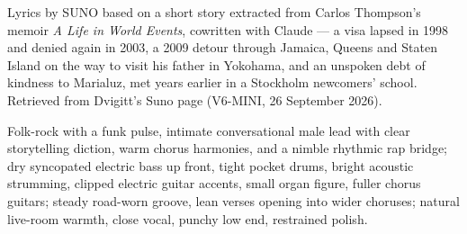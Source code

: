 
\begin{notes}
Lyrics by SUNO based on a short story extracted from Carlos Thompson's memoir \emph{A Life in World Events}, cowritten with Claude — a visa lapsed in 1998 and denied again in 2003, a 2009 detour through Jamaica, Queens and Staten Island on the way to visit his father in Yokohama, and an unspoken debt of kindness to Marialuz, met years earlier in a Stockholm newcomers' school. Retrieved from Dvigitt's Suno page (V6-MINI, 26 September 2026).
\end{notes}
\begin{style}
Folk-rock with a funk pulse, intimate conversational male lead with clear storytelling diction, warm chorus harmonies, and a nimble rhythmic rap bridge; dry syncopated electric bass up front, tight pocket drums, bright acoustic strumming, clipped electric guitar accents, small organ figure, fuller chorus guitars; steady road-worn groove, lean verses opening into wider choruses; natural live-room warmth, close vocal, punchy low end, restrained polish.
\end{style}
